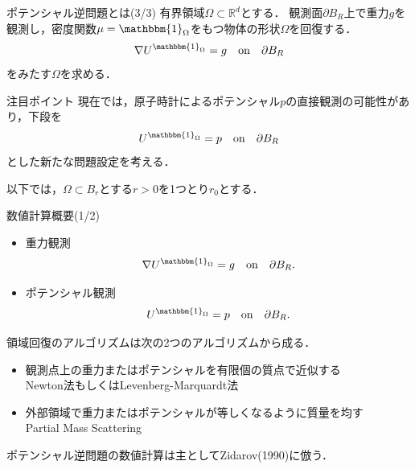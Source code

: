 \documentclass[dvipdfmx]{beamer}
\begin{document}
\begin{frame}{ポテンシャル逆問題とは(3/3)}
  有界領域$\Omega\subset\mathbb{R}^d$とする．
  観測面$\partial B_R$上で重力$g$を観測し，密度関数$\mu=\mathbbm{1}_\Omega$をもつ物体の形状$\Omega$を回復する．
    \[
      \nabla U^{\mathbbm{1}_\Omega} = g \quad \mathrm{on} \quad \partial B_R \nonumber
    \]
  をみたす$\Omega$を求める．
  \begin{itembox}[c]{注目ポイント}
  現在では，原子時計によるポテンシャル$p$の直接観測の可能性があり，下段を　
  \[
    U^{\mathbbm{1}_\Omega} = p \quad \mathrm{on} \quad \partial B_R
  \]
  とした新たな問題設定を考える．
  \end{itembox}
  以下では，$\Omega\subset B_r$とする$r>0$を1つとり$r_0$とする．
\end{frame}

\begin{frame}{数値計算概要(1/2)}
  \begin{itemize}
    \item 重力観測
    \[
      \nabla U^{\mathbbm{1}_\Omega} = g \quad \mathrm{on} \quad \partial B_R. \nonumber
    \]
  
    \item ポテンシャル観測
    \[
      U^{\mathbbm{1}_\Omega} = p \quad \mathrm{on} \quad \partial B_R. \nonumber
    \]
  \end{itemize}
領域回復のアルゴリズムは次の2つのアルゴリズムから成る．
\begin{itemize}
  \item 観測点上の重力またはポテンシャルを有限個の質点で近似する \\
  Newton法もしくはLevenberg-Marquardt法
  \item 外部領域で重力またはポテンシャルが等しくなるように質量を均す \\
  Partial Mass Scattering
\end{itemize}
ポテンシャル逆問題の数値計算は主としてZidarov(1990)に倣う．

\end{frame}
\end{document}
